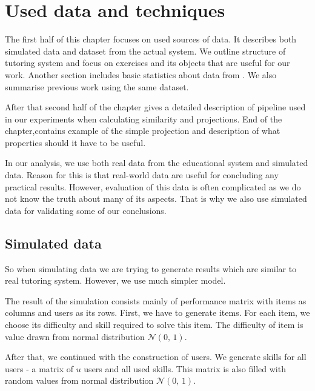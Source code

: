 \documentclass[
  digital, %
  table,   %
  nolof,     %
  nolot,     %
  nocover,
  color
]{fithesis3}
\begin{document}

\chapter{Used data and techniques}\label{used-data-and-techniques}


The first half of this chapter focuses on used sources of data. It describes both simulated data and dataset from the actual system.
We outline structure of tutoring system and focus on exercises and its objects that are useful for our work. Another section includes basic statistics about data from \umimeCesky{}. We also summarise previous work using the same dataset.

After that second half of the chapter gives a detailed description of pipeline used in our experiments when calculating similarity and projections. End of the chapter,contains example of the simple projection and description of what properties should it have to be useful.


In our analysis, we use both real data from the educational system and simulated data. Reason for this is that real-world data are useful for concluding any practical results. However, evaluation of this data is often complicated as we do not know the truth about many of its aspects. That is why we also use simulated data for validating some of our conclusions.


\section{Simulated data}\label{simulated-data}

So when simulating data we are trying to generate results which are similar to real tutoring system. However, we use much simpler model.

The result of the simulation consists mainly of performance matrix with items as columns and users as its rows. First, we have to generate items. For each item, we choose its difficulty and skill required to solve this item. The difficulty of item is value drawn from normal distribution $\mathcal{N}(0,\,1)$.

After that, we continued with the construction of users. We generate skills for all users - a matrix of $u$ users and all used skills. This matrix is also filled with random values from normal distribution $\mathcal{N}(0,\,1)$.
\end{document}
